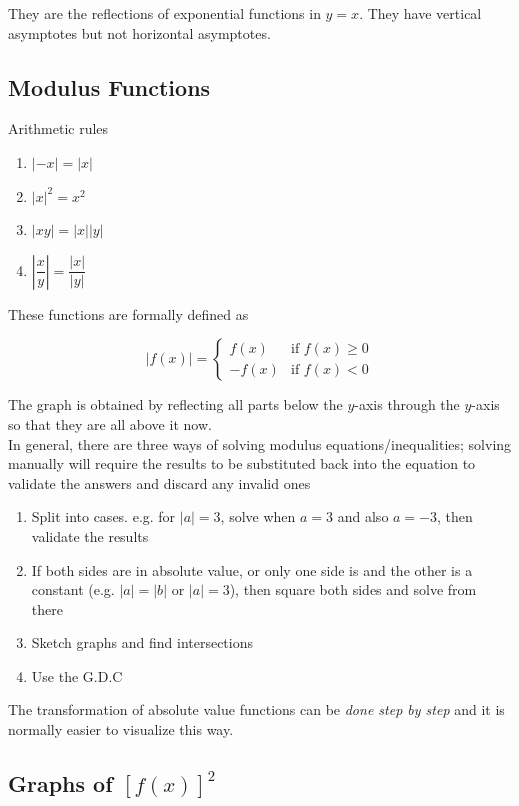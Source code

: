 \documentclass[11pt]{article}
\newcommand{\lb}{\\[8pt]}
\begin{document}
They are the reflections of exponential functions in $y = x$. They have vertical asymptotes but not horizontal asymptotes.

\pagebreak

\subsection{Modulus Functions}

Arithmetic rules

\begin{enumerate}
  \item $|-x| = |x|$
  \item $|x|^2 = x^2$
  \item $|xy| = |x||y|$
  \item $\left|\dfrac{x}{y}\right| = \dfrac{|x|}{|y|}$
\end{enumerate}

\noindent These functions are formally defined as

$$
  |f(x)| = \left\{
  \begin{array}{ll}
    f(x)  & \mbox{if } f(x) \geq 0 \\
    -f(x) & \mbox{if } f(x) < 0
  \end{array}
  \right.
$$

\noindent The graph is obtained by reflecting all parts below the $y$-axis through the $y$-axis so that they are all above it now.\lb
In general, there are three ways of solving modulus equations/inequalities; solving manually will require the results to be substituted back into the equation to validate the answers and discard any invalid ones
\begin{enumerate}
  \item Split into cases. e.g. for $|a| = 3$, solve when $a = 3$ and also $a = -3$, then validate the results
  \item If both sides are in absolute value, or only one side is and the other is a constant (e.g. $|a| = |b|$ or $|a| = 3$), then square both sides and solve from there
  \item Sketch graphs and find intersections
  \item Use the G.D.C
\end{enumerate}
The transformation of absolute value functions can be \textit{done step by step} and it is normally easier to visualize this way.

\subsection{Graphs of \texorpdfstring{$[f(x)]^2$}{f(x) squared}}
\end{document}
